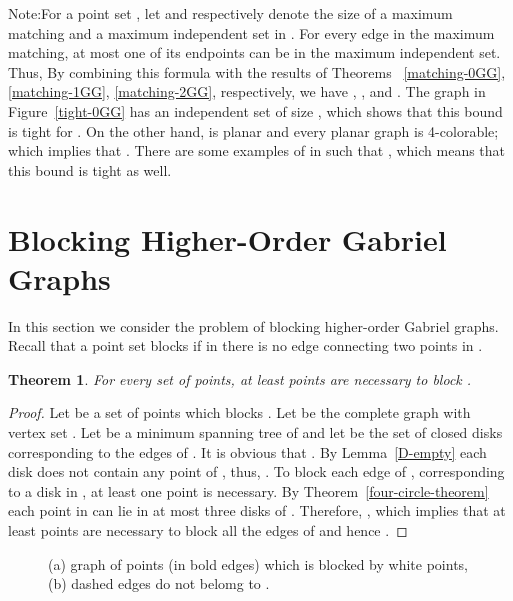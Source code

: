 \documentclass[11pt,a4paper]{article}
\newcommand{\kGG}[2]{}
\newtheorem{theorem}{Theorem}
\begin{document}
\begin{paragraph}{Note:}For a point set , let  and  respectively denote the size of a maximum matching and a maximum independent set in \kGG{k}{}. For every edge in the maximum matching, at most one of its endpoints can be in the maximum independent set. Thus,
By combining this formula with the results of Theorems ~\ref{matching-0GG}, \ref{matching-1GG}, \ref{matching-2GG}, respectively, we have , , and . The \kGG{0}{} graph in Figure~\ref{tight-0GG} has an independent set of size , which shows that this bound is tight for \kGG{0}{}. On the other hand, \kGG{0}{} is planar and every planar graph is 4-colorable; which implies that . There are some examples of \kGG{0}{} in \cite{Matula1980} such that , which means that this bound is tight as well.
\end{paragraph}

\section{Blocking Higher-Order Gabriel Graphs}
\label{blocking-section}
In this section we consider the problem of blocking higher-order Gabriel graphs. Recall that a point set  blocks \kGG{k}{(P)} if in \kGG{k}{(P\cup K)} there is no edge connecting two points in . 

\begin{theorem}
\label{blocking-thr1}
For every set  of  points, at least  points are necessary to block \kGG{0}{(P)}.
\end{theorem}
\begin{proof}
Let  be a set of  points which blocks \kGG{0}{(P)}. Let  be the complete graph with vertex set . Let  be a minimum spanning tree of  and let  be the set of closed disks corresponding to the edges of . It is obvious that . By Lemma~\ref{D-empty} each disk  does not contain any point of , thus,  . To block each edge of , corresponding to a disk in , at least one point is necessary. By Theorem~\ref{four-circle-theorem} each point in  can lie in at most three disks of . Therefore, , which implies that at least  points are necessary to block all the edges of  and hence \kGG{0}{(P)}.
\end{proof}
\begin{figure}[htb]
  \centering
\setlength{\tabcolsep}{0in}
  
  \caption{(a) \kGG{0}{} graph of  points (in bold edges) which is blocked by  white points, (b) dashed edges do not belomg to \kGG{0}{}.}
\label{blocking-fig}
\end{figure}
\end{document}
